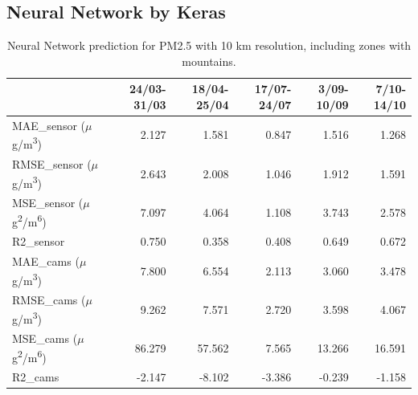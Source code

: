 \subsection{Neural Network by Keras}
\begin{table}[H]
\begin{tabular}{lrrrrr}
\toprule
 &  24/03-31/03 &  18/04-25/04 &  17/07-24/07 &  3/09-10/09 &  7/10-14/10 \\
\midrule
 MAE\_sensor ($\mu$g/m\textsuperscript{3})&        2.127 &        1.581 &        0.847 &       1.516 &       1.268 \\
RMSE\_sensor ($\mu$g/m\textsuperscript{3})&        2.643 &        2.008 &        1.046 &       1.912 &       1.591 \\
 MSE\_sensor ($\mu$g\textsuperscript{2}/m\textsuperscript{6})&        7.097 &        4.064 &        1.108 &       3.743 &       2.578 \\
  R2\_sensor &        0.750 &        0.358 &        0.408 &       0.649 &       0.672 \\
   MAE\_cams ($\mu$g/m\textsuperscript{3})&        7.800 &        6.554 &        2.113 &       3.060 &       3.478 \\
  RMSE\_cams ($\mu$g/m\textsuperscript{3})&        9.262 &        7.571 &        2.720 &       3.598 &       4.067 \\
   MSE\_cams ($\mu$g\textsuperscript{2}/m\textsuperscript{6})&       86.279 &       57.562 &        7.565 &      13.266 &      16.591 \\
    R2\_cams &       -2.147 &       -8.102 &       -3.386 &      -0.239 &      -1.158 \\
\bottomrule
\end{tabular}
\caption{Neural Network prediction for PM2.5 with 10 km resolution, including zones with mountains.}
\end{table}
